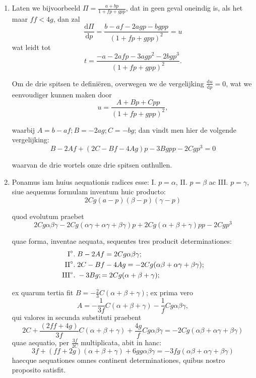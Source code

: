 \documentclass[10pt,a4paper]{article}
\newcommand{\switchenum}{\setcounter{enumi}{\arabic{enumi}-1}\switchcolumn}
\def\D{\mathrm{d}}
\begin{document}
\begin{paracol}{2}
\begin{enumerate}[topsep=1px]
		\switchenum
		\item Laten we bijvoorbeeld $\Pi = \frac{a+bp}{1+fp+gpp}$, dat in geen geval oneindig is, als het maar $ff< 4g$, dan zal
		\[
			\frac{\D \Pi}{\D p} = \frac{b-af-2agp-bgpp}{(1+fp+gpp)^2} = u
		\]
		wat leidt tot
		\[
			t = \frac{-a-2afp-3agp^2-2bgp^3}{(1+fp+gpp)^2}.
		\]
		\par Om de drie spitsen te definiëren, 	overwegen we de vergelijking $\frac{\D u}{\D p}=0$, wat we eenvoudiger kunnen maken door 
		\[
			u  =  \frac{A+Bp+Cpp}{(1+fp+gpp)^2},
		\]
		\par waarbij $A=b-af; B= -2ag; C=-bg$; dan vindt men hier de volgende vergelijking:
		\[
			B-2Af+(2C-Bf-4Ag)p-3Bgpp-2Cgp^3 = 0
		\]
		\par waarvan de drie wortels onze drie spitsen onthullen.
		
		\newpage %
		\switchcolumn*
		
		\item Ponamus iam huius aequationis radices esse: I\degree. $p=\alpha$, II\degree. $p=\beta$ ac III\degree. $p=\gamma$, siue aequemus formulam inventum huic producto:
		\[
			2Cg(a-p)(\beta-p)(\gamma-p)
		\]
		\par quod evolutum praebet
		\[
			2Cg\alpha \beta \gamma - 2Cg(\alpha \gamma+\alpha \gamma+\beta \gamma)p+2Cg(\alpha+\beta+\gamma)pp - 2Cgp^3
		\]
		\par quae forma, inventae aequata, sequentes tres producit determinationes:
		\begin{align*}
			\text{I}\degree. \;& B-2Af = 2Cg\alpha\beta\gamma;\\
			\text{II}\degree. \; & 2C-Bf-4Ag = -2Cg(\alpha \beta +\alpha \gamma+\beta \gamma);\\
			\text{III}\degree. \; & -3Bg; = 2Cg(\alpha+\beta+\gamma);
		\end{align*}
		
		\par ex quarum tertia fit $B=-\frac{2}{3}C(\alpha+\beta+\gamma)$; ex prima vero
		\[
			A = -\frac{1}{3f}C(\alpha+\beta+\gamma)-\frac{1}{f}Cg\alpha \beta \gamma,
		\]
		qui valores in secunda substituti praebent
		\[
			2C+\frac{(2ff+4g)}{3f}C(\alpha+ \beta + \gamma)+\frac{4g}{f}Cg\alpha \beta \gamma  = -2Cg(\alpha \beta + \alpha \gamma+\beta \gamma)
		\]
		quae aequatio, per $\frac{3f}{2C}$ multiplicata, abit in hanc:
		\[
			3f+(ff+2g)(\alpha+\beta+\gamma)+6gg\alpha  \beta \gamma = -3fg(\alpha \beta + \alpha \gamma + \beta \gamma)
		\]
		haecque aequationes omnes continent determinationes, quibus nostro proposito satisfit.
		

\end{enumerate}
\end{paracol}
\end{document}

